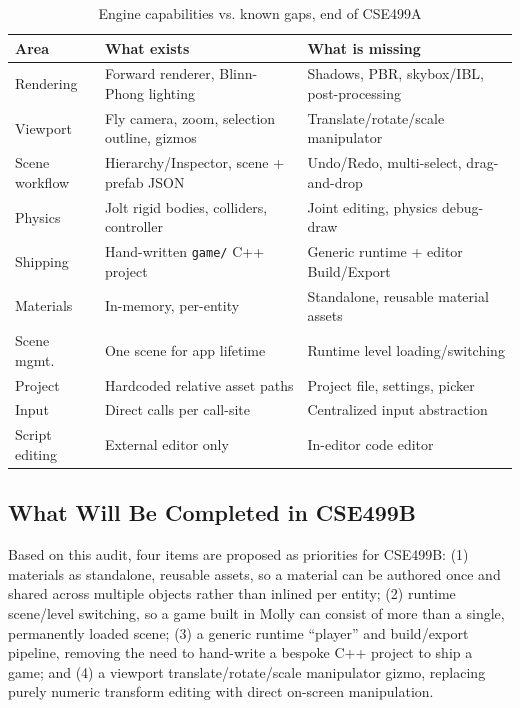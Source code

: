 \documentclass[conference]{IEEEtran}
\begin{document}
\begin{table}[htbp]
\caption{Engine capabilities vs. known gaps, end of CSE499A}
\label{tab:gaps}
\centering
\footnotesize
\begin{tabular}{p{1.6cm}p{2.9cm}p{2.9cm}}
\toprule
\textbf{Area} & \textbf{What exists} & \textbf{What is missing} \\
\midrule
Rendering & Forward renderer, Blinn-Phong lighting & Shadows, PBR, skybox/IBL, post-processing \\
Viewport & Fly camera, zoom, selection outline, gizmos & Translate/rotate/scale manipulator \\
Scene workflow & Hierarchy/Inspector, scene + prefab JSON & Undo/Redo, multi-select, drag-and-drop \\
Physics & Jolt rigid bodies, colliders, controller & Joint editing, physics debug-draw \\
Shipping & Hand-written \texttt{game/} C++ project & Generic runtime + editor Build/Export \\
Materials & In-memory, per-entity & Standalone, reusable material assets \\
Scene mgmt. & One scene for app lifetime & Runtime level loading/switching \\
Project & Hardcoded relative asset paths & Project file, settings, picker \\
Input & Direct calls per call-site & Centralized input abstraction \\
Script editing & External editor only & In-editor code editor \\
\bottomrule
\end{tabular}
\end{table}

\subsection{What Will Be Completed in CSE499B}
\label{sec:next}

Based on this audit, four items are proposed as priorities for CSE499B:
(1) materials as standalone, reusable assets, so a material can be
authored once and shared across multiple objects rather than inlined per
entity; (2) runtime scene/level switching, so a game built in Molly can
consist of more than a single, permanently loaded scene; (3) a generic
runtime ``player'' and build/export pipeline, removing the need to
hand-write a bespoke C++ project to ship a game; and (4) a viewport
translate/rotate/scale manipulator gizmo, replacing purely numeric
transform editing with direct on-screen manipulation.
\end{document}
